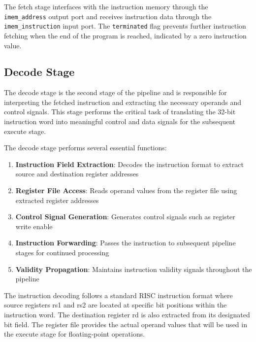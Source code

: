 The fetch stage interfaces with the instruction memory through the \texttt{imem\_address} output port and receives instruction data through the \texttt{imem\_instruction} input port. The \texttt{terminated} flag prevents further instruction fetching when the end of the program is reached, indicated by a zero instruction value.

\subsection{Decode Stage}
\label{subsec:decode_stage}

The decode stage is the second stage of the pipeline and is responsible for interpreting the fetched instruction and extracting the necessary operands and control signals. This stage performs the critical task of translating the 32-bit instruction word into meaningful control and data signals for the subsequent execute stage.

The decode stage performs several essential functions:
\begin{enumerate}
    \item \textbf{Instruction Field Extraction}: Decodes the instruction format to extract source and destination register addresses
    \item \textbf{Register File Access}: Reads operand values from the register file using extracted register addresses
    \item \textbf{Control Signal Generation}: Generates control signals such as register write enable
    \item \textbf{Instruction Forwarding}: Passes the instruction to subsequent pipeline stages for continued processing
    \item \textbf{Validity Propagation}: Maintains instruction validity signals throughout the pipeline
\end{enumerate}

The instruction decoding follows a standard RISC instruction format where source registers rs1 and rs2 are located at specific bit positions within the instruction word. The destination register rd is also extracted from its designated bit field. The register file provides the actual operand values that will be used in the execute stage for floating-point operations.

